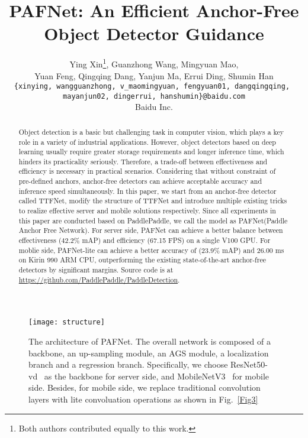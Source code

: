 \documentclass[10pt,twocolumn,letterpaper]{article}
\begin{document}
	
\title{PAFNet: An Efficient Anchor-Free Object Detector Guidance}
	\author{Ying Xin\thanks{Both authors contributed equally to this work.}, Guanzhong Wang, Mingyuan Mao, 
		   \\Yuan Feng, Qingqing Dang, Yanjun Ma, Errui Ding, Shumin Han \\

    {\tt\small\{xinying, wangguanzhong, v\_maomingyuan, fengyuan01, dangqingqing, }\\
     {\tt\small\ mayanjun02, dingerrui, hanshumin\}@baidu.com
    }
        \\ Baidu Inc.
    }
   
	
    \maketitle
\begin{abstract}
Object detection is a basic but challenging task in computer vision, which plays a key role in a variety of industrial applications. 
However, object detectors based on deep learning usually require greater storage requirements and longer inference time, which hinders its practicality seriously. Therefore, a trade-off between effectiveness and efficiency is necessary in practical scenarios. 
Considering that without constraint of pre-defined anchors, anchor-free detectors can achieve acceptable accuracy and inference speed simultaneously. In this paper, we start from an anchor-free detector called TTFNet, modify the structure of TTFNet and introduce multiple existing tricks to realize effective server and mobile solutions respectively.
Since all experiments in this paper are conducted based on PaddlePaddle, we call the model as PAFNet(Paddle Anchor Free Network). For server side, PAFNet can achieve a better balance between effectiveness (42.2\% mAP) and efficiency (67.15 FPS) on a single V100 GPU. For moblie side, PAFNet-lite can achieve a better accuracy of (23.9\% mAP) and 26.00 ms on Kirin 990 ARM CPU, outperforming the existing state-of-the-art anchor-free detectors by significant margins. Source code is at \url{https://github.com/PaddlePaddle/PaddleDetection}.
	\end{abstract}

	\begin{figure*}[]
\begin{center}
 		\centerline{\texttt{[image: structure]}}
		\caption{The architecture of PAFNet. The overall network is composed of a backbone, an up-sampling module, an AGS module, a localization branch and a regression branch. Specifically, we choose ResNet50-vd~\cite{ResNet16} as the backbone for server side, and MobileNetV3~\cite{mobilenetv3} for mobile side. Besides, for mobile side, we replace traditional convolution layers with lite convoluation operations as shown in Fig.~\ref{Fig3}}
		\label{Fig1}
	\end{center}
\end{figure*}
    
\end{document}
